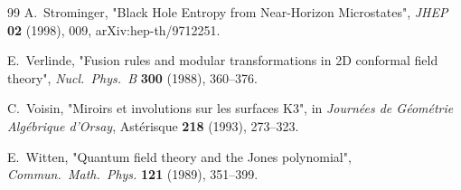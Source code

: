 \documentclass[11pt,a4paper]{amsart}
\theoremstyle{definition}
\begin{document}
\begin{thebibliography}{99}
A.\ Strominger,
"Black Hole Entropy from Near-Horizon Microstates",
\emph{JHEP} \textbf{02} (1998), 009,
arXiv:hep-th/9712251.

E.\ Verlinde,
"Fusion rules and modular transformations in 2D conformal field theory",
\emph{Nucl.\ Phys.\ B} \textbf{300} (1988), 360--376.

C.\ Voisin,
"Miroirs et involutions sur les surfaces K3",
in \emph{Journ\'ees de G\'eom\'etrie Alg\'ebrique d'Orsay}, Ast\'erisque \textbf{218}
(1993), 273--323.

E.\ Witten,
"Quantum field theory and the Jones polynomial",
\emph{Commun.\ Math.\ Phys.} \textbf{121} (1989), 351--399.

\end{thebibliography}
\end{document}
